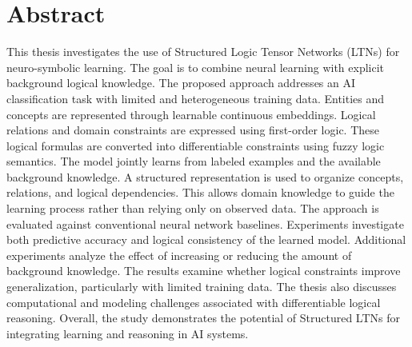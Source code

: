 \cleardoublepage
{}
{}
\begingroup
\let\clearpage\relax
\let\cleardoublepage\relax
\chapter*{Abstract}
\noindent
This thesis investigates the use of Structured Logic Tensor Networks (LTNs) for neuro-symbolic learning.
The goal is to combine neural learning with explicit background logical knowledge.
The proposed approach addresses an AI classification task with limited and heterogeneous training data.
Entities and concepts are represented through learnable continuous embeddings.
Logical relations and domain constraints are expressed using first-order logic.
These logical formulas are converted into differentiable constraints using fuzzy logic semantics.
The model jointly learns from labeled examples and the available background knowledge.
A structured representation is used to organize concepts, relations, and logical dependencies.
This allows domain knowledge to guide the learning process rather than relying only on observed data.
The approach is evaluated against conventional neural network baselines.
Experiments investigate both predictive accuracy and logical consistency of the learned model.
Additional experiments analyze the effect of increasing or reducing the amount of background knowledge.
The results examine whether logical constraints improve generalization, particularly with limited training data.
The thesis also discusses computational and modeling challenges associated with differentiable logical reasoning. Overall, the study demonstrates the potential of Structured LTNs for integrating learning and reasoning in AI systems.
\endgroup
\vfill